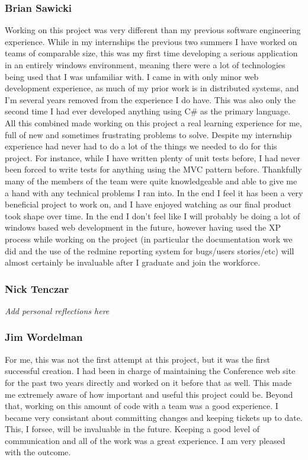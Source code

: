 \documentclass[12pt]{article}
\begin{document}
\subsubsection{Brian Sawicki}
Working on this project was very different than my previous software engineering experience.  While in my internships the previous two summers I have worked on teams of comparable size, this was my first time developing a serious application in an entirely windows environment, meaning there were a lot of technologies being used that I was unfamiliar with.  I came in with only minor web development experience, as much of my prior work is in distributed systems, and I'm several years removed from the experience I do have.  This was also only the second time I had ever developed anything using C# as the primary language.  All this combined made working on this project a real learning experience for me, full of new and sometimes frustrating problems to solve.  Despite my internship experience had never had to do a lot of the things we needed to do for this project.  For instance, while I have written plenty of unit tests before, I had never been forced to write tests for anything using the MVC pattern before.  Thankfully many of the members of the team were quite knowledgeable and able to give me a hand with any technical problems I ran into.  In the end I feel it has been a very beneficial project to work on, and I have enjoyed watching as our final product took shape over time. In the end I don't feel like I will probably be doing a lot of windows based web development in the future, however having used the XP process while working on the project (in particular the documentation work we did and the use of the redmine reporting system for bugs/users stories/etc) will almost certainly be invaluable after I graduate and join the workforce.
\subsubsection{Nick Tenczar}
\textit{Add personal reflections here}
\subsubsection{Jim Wordelman}
For me, this was not the first attempt at this project, but it was the first
successful creation. I had been in charge of maintaining the Conference web site
for the past two years directly and worked on it before that as well. This made
me extremely aware of how important and useful this project could be. Beyond
that, working on this amount of code with a team was a good experience. I became
very consistant about committing changes and keeping tickets up to date. This, I
forsee, will be invaluable in the future. Keeping a good level of communication
and all of the work was a great experience. I am very pleased with the outcome.
\newpage
\end{document}
